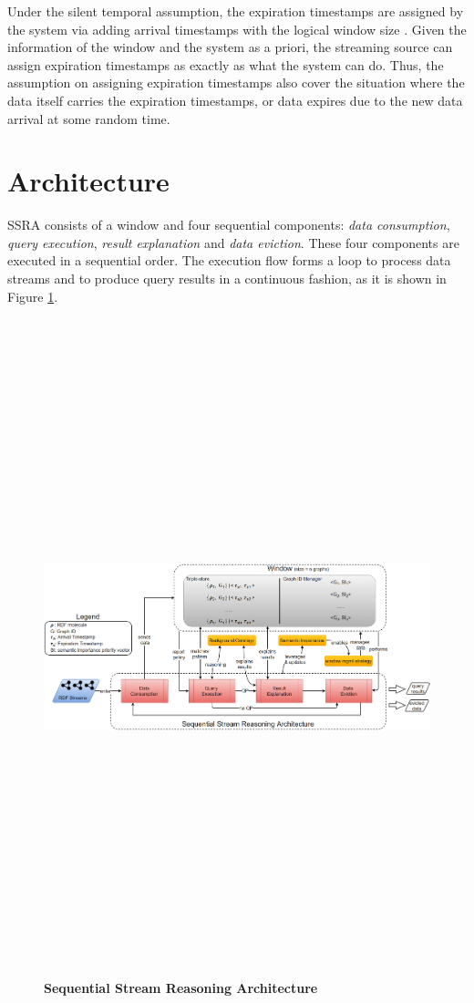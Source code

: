 Under the silent temporal assumption, the expiration timestamps are assigned by the system via adding arrival timestamps with the logical window size \cite{barbieri2010incremental}. 
Given the information of the window and the system as a priori, the streaming source can assign expiration timestamps as exactly as what the system can do. 
Thus, the assumption on assigning expiration timestamps also cover the situation where the data itself carries the expiration timestamps, or data expires due to the new data arrival at some random time. 
%
\section{Architecture}
SSRA consists of a window and four sequential components: \textit{data consumption}, \textit{query execution}, \textit{result explanation} and \textit{data eviction}.
These four components are executed in a sequential order. 
The execution flow forms a loop to process data streams and to produce query results in a continuous fashion, as it is shown in Figure \ref{fig:4-ssra}. 

\begin{figure}[!htbp]
	\centering
	\includegraphics[angle=90,height=7.5in]{img/4-ssra.png}
	\caption{\textbf{Sequential Stream Reasoning Architecture}}
	\label{fig:4-ssra}
\end{figure}

